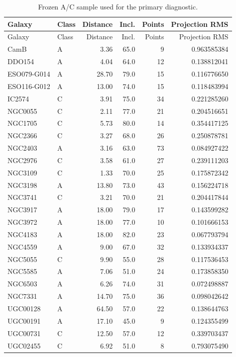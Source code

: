 \documentclass[11pt]{article}
\begin{document}
\begin{longtable}{llrrrr}
\caption{Frozen A/C sample used for the primary diagnostic.}\\
\toprule
Galaxy & Class & Distance & Incl. & Points & Projection RMS\\
\midrule
\endfirsthead
\toprule
Galaxy & Class & Distance & Incl. & Points & Projection RMS\\
\midrule
\endhead
CamB & A & 3.36 & 65.0 & 9 & 0.963585384\\
DDO154 & A & 4.04 & 64.0 & 12 & 0.138812041\\
ESO079-G014 & A & 28.70 & 79.0 & 15 & 0.116776650\\
ESO116-G012 & A & 13.00 & 74.0 & 15 & 0.118483994\\
IC2574 & C & 3.91 & 75.0 & 34 & 0.221285260\\
NGC0055 & C & 2.11 & 77.0 & 21 & 0.204516651\\
NGC1705 & C & 5.73 & 80.0 & 14 & 0.354417125\\
NGC2366 & C & 3.27 & 68.0 & 26 & 0.250878781\\
NGC2403 & A & 3.16 & 63.0 & 73 & 0.084927422\\
NGC2976 & C & 3.58 & 61.0 & 27 & 0.239111203\\
NGC3109 & C & 1.33 & 70.0 & 25 & 0.175872342\\
NGC3198 & A & 13.80 & 73.0 & 43 & 0.156224718\\
NGC3741 & C & 3.21 & 70.0 & 21 & 0.204417844\\
NGC3917 & A & 18.00 & 79.0 & 17 & 0.143599282\\
NGC3972 & A & 18.00 & 77.0 & 10 & 0.101666153\\
NGC4183 & A & 18.00 & 82.0 & 23 & 0.067793794\\
NGC4559 & A & 9.00 & 67.0 & 32 & 0.133934337\\
NGC5055 & C & 9.90 & 55.0 & 28 & 0.117536453\\
NGC5585 & A & 7.06 & 51.0 & 24 & 0.173858350\\
NGC6503 & A & 6.26 & 74.0 & 31 & 0.072498887\\
NGC7331 & A & 14.70 & 75.0 & 36 & 0.098042642\\
UGC00128 & A & 64.50 & 57.0 & 22 & 0.138644763\\
UGC00191 & A & 17.10 & 45.0 & 9 & 0.124355499\\
UGC00731 & C & 12.50 & 57.0 & 12 & 0.339703437\\
UGC02455 & C & 6.92 & 51.0 & 8 & 0.793075490\\

\end{longtable}
\end{document}
